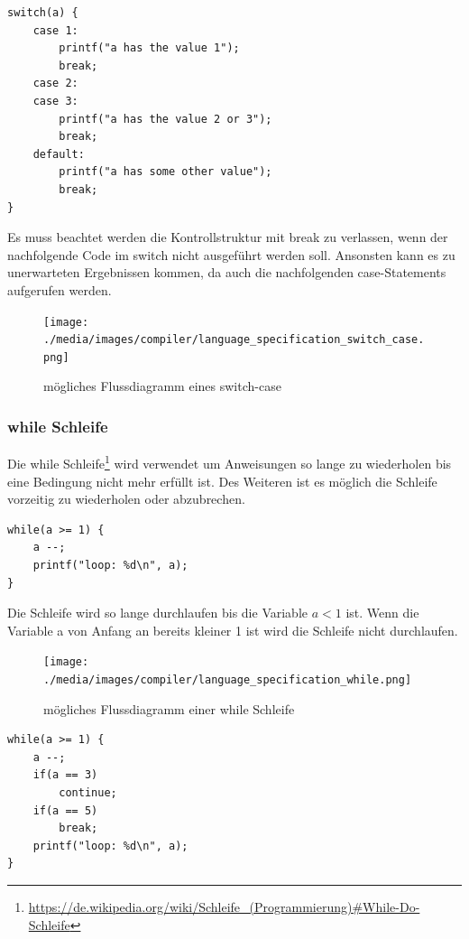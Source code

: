 
\begin{lstlisting}[language=CMM]
switch(a) {
	case 1:
		printf("a has the value 1");
		break;
	case 2:
	case 3:
		printf("a has the value 2 or 3");
		break;
	default:
		printf("a has some other value");
		break;
}
\end{lstlisting}

Es muss beachtet werden die Kontrollstruktur mit break zu verlassen, wenn der nachfolgende Code im switch nicht ausgef\"uhrt werden soll. Ansonsten kann es zu unerwarteten Ergebnissen kommen, da auch die nachfolgenden case-Statements aufgerufen werden.

\begin{figure}[h]
\centering
\texttt{[image: ./media/images/compiler/language\_specification\_switch\_case.png]}
\caption{m\"ogliches Flussdiagramm eines switch-case}
\label{language_specification_switch_case}
\end{figure}

\newpage
\subsubsection{while Schleife}

Die while Schleife\footnote{\url{https://de.wikipedia.org/wiki/Schleife_(Programmierung)\#While-Do-Schleife}} wird verwendet um Anweisungen so lange zu wiederholen bis eine Bedingung nicht mehr erf\"ullt ist. Des Weiteren ist es m\"oglich die Schleife vorzeitig zu wiederholen oder abzubrechen. 


\begin{lstlisting}[language=CMM]
while(a >= 1) {
	a --;
	printf("loop: %d\n", a);
}
\end{lstlisting}

Die Schleife wird so lange durchlaufen bis die Variable $a < 1$ ist. Wenn die Variable a von Anfang an bereits kleiner 1 ist wird die Schleife nicht durchlaufen.

\begin{figure}[h]
\centering
\texttt{[image: ./media/images/compiler/language\_specification\_while.png]}
\caption{m\"ogliches Flussdiagramm einer while Schleife}
\label{language_specification_while}
\end{figure}


\begin{lstlisting}[language=CMM]
while(a >= 1) {
	a --;
	if(a == 3)
		continue;
	if(a == 5)
		break;
	printf("loop: %d\n", a);
}
\end{lstlisting}

